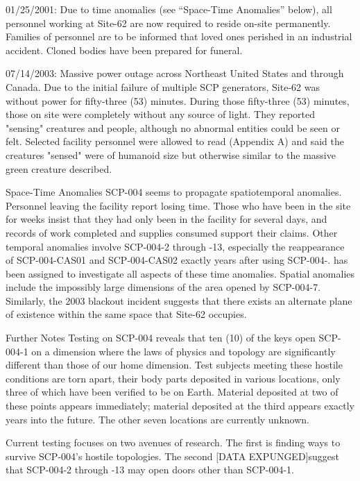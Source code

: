 \documentclass[a4paper, 11pt]{article}
\newcommand{\lb}{\ensuremath{[}}
\newcommand{\rb}{\ensuremath{]}}
\newcommand{\expunged}{\lb DATA EXPUNGED\rb}
\begin{document}
01/25/2001: Due to time anomalies (see “Space-Time Anomalies” below), all personnel working at Site-62 are now required to reside on-site permanently. Families of personnel are to be informed that loved ones perished in an industrial accident. Cloned bodies have been prepared for funeral.

07/14/2003: Massive power outage across Northeast United States and through Canada. Due to the initial failure of multiple SCP generators, Site-62 was without power for fifty-three (53) minutes. During those fifty-three (53) minutes, those on site were completely without any source of light. They reported "sensing" creatures and people, although no abnormal entities could be seen or felt. Selected facility personnel were allowed to read  (Appendix A) and said the creatures "sensed" were of humanoid size but otherwise similar to the massive green creature described.

Space-Time Anomalies
SCP-004 seems to propagate spatiotemporal anomalies. Personnel leaving the facility report losing time. Those who have been in the site for weeks insist that they had only been in the facility for several days, and records of work completed and supplies consumed support their claims. Other temporal anomalies involve SCP-004-2 through -13, especially the reappearance of SCP-004-CAS01 and SCP-004-CAS02 exactly  years after using SCP-004-.  has been assigned to investigate all aspects of these time anomalies. Spatial anomalies include the impossibly large dimensions of the area opened by SCP-004-7. Similarly, the 2003 blackout incident suggests that there exists an alternate plane of existence within the same space that Site-62 occupies.

Further Notes
Testing on SCP-004 reveals that ten (10) of the keys open SCP-004-1 on a dimension where the laws of physics and topology are significantly different than those of our home dimension. Test subjects meeting these hostile conditions are torn apart, their body parts deposited in various locations, only three of which have been verified to be on Earth. Material deposited at two of these points appears immediately; material deposited at the third appears exactly  years into the future. The other seven locations are currently unknown.

Current testing focuses on two avenues of research. The first is finding ways to survive SCP-004’s hostile topologies. The second \expunged suggest that SCP-004-2 through -13 may open doors other than SCP-004-1.
\end{document}
